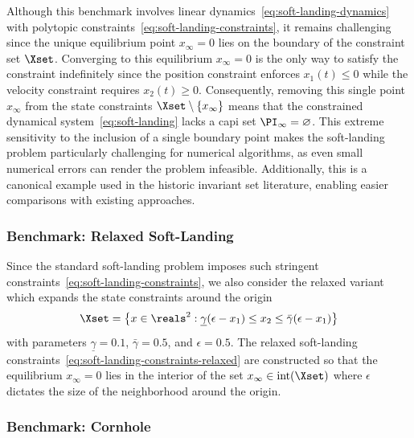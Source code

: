 Although this benchmark involves linear dynamics~\eqref{eq:soft-landing-dynamics} with polytopic constraints~\eqref{eq:soft-landing-constraints}, it remains challenging since the unique equilibrium point $x_\infty = 0$ lies on the boundary of the constraint set $\Xset$. 
Converging to this equilibrium $x_\infty = 0$ is the only way to satisfy the constraint indefinitely since the position constraint enforces $x_1(t) \leq 0$ while the velocity constraint requires $x_2(t) \geq 0$. 
Consequently, removing this single point $x_\infty$ from the state constraints $\Xset \setminus \{ x_\infty\}$ means that the constrained dynamical system~\eqref{eq:soft-landing} lacks a \ac{capi} set $\PI_\infty = \varnothing$. 
This extreme sensitivity to the inclusion of a single boundary point makes the soft-landing problem particularly challenging for numerical algorithms, as even small numerical errors can render the problem infeasible. 
Additionally, this is a canonical example used in the historic invariant set literature, enabling easier comparisons with existing approaches. 

\subsubsection{Benchmark: Relaxed Soft-Landing}

Since the standard soft-landing problem imposes such stringent constraints~\eqref{eq:soft-landing-constraints}, we also consider the relaxed variant~\cite{} which expands the state constraints around the origin
\begin{align}
    \label{eq:soft-landing-constraints-relaxed}
    \Xset = \big\{ x \in \reals^2 : \underline{\gamma}( \epsilon - x_1) \leq x_2 \leq \bar{\gamma}( \epsilon - x_1) 
    \big\}
\end{align}
with parameters $\underline{\gamma} = 0.1$, $\bar{\gamma} = 0.5$, and $\epsilon = 0.5$. The relaxed soft-landing constraints~\eqref{eq:soft-landing-constraints-relaxed} are constructed so that the equilibrium $x_\infty = 0$ lies in the interior of the set $x_\infty \in \mathrm{int}(\Xset)$ where $\epsilon$ dictates the size of the neighborhood around the origin. 

\subsubsection{Benchmark: Cornhole}

